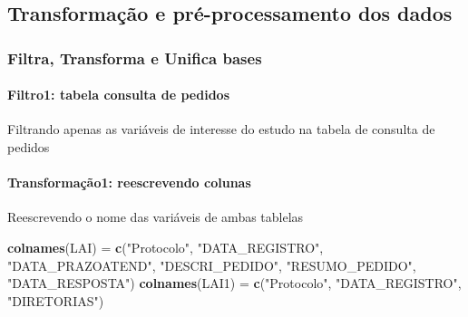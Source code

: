 \documentclass[]{article}
\newenvironment{Shaded}{\begin{snugshade}}{\end{snugshade}}
\newcommand{\KeywordTok}[1]{\textcolor[rgb]{0.13,0.29,0.53}{\textbf{#1}}}
\newcommand{\DataTypeTok}[1]{\textcolor[rgb]{0.13,0.29,0.53}{#1}}
\newcommand{\StringTok}[1]{\textcolor[rgb]{0.31,0.60,0.02}{#1}}
\newcommand{\OperatorTok}[1]{\textcolor[rgb]{0.81,0.36,0.00}{\textbf{#1}}}
\newcommand{\NormalTok}[1]{#1}
\let\oldparagraph\paragraph
\renewcommand{\paragraph}[1]{\oldparagraph{#1}\mbox{}}
\begin{document}
\subsection{Transformação e pré-processamento dos
dados}\label{transformacao-e-pre-processamento-dos-dados}

\subsubsection{Filtra, Transforma e Unifica
bases}\label{filtra-transforma-e-unifica-bases}

\paragraph{Filtro1: tabela consulta de
pedidos}\label{filtro1-tabela-consulta-de-pedidos}

Filtrando apenas as variáveis de interesse do estudo na tabela de
consulta de pedidos

\begin{Shaded}
\end{Shaded}

\paragraph{Transformação1: reescrevendo
colunas}\label{transformacao1-reescrevendo-colunas}

Reescrevendo o nome das variáveis de ambas tablelas

\begin{Shaded}
\begin{Highlighting}[]
\KeywordTok{colnames}\NormalTok{(LAI) =}\StringTok{ }\KeywordTok{c}\NormalTok{(}\StringTok{"Protocolo"}\NormalTok{, }\StringTok{"DATA_REGISTRO"}\NormalTok{, }\StringTok{"DATA_PRAZOATEND"}\NormalTok{, }\StringTok{"DESCRI_PEDIDO"}\NormalTok{,}
                     \StringTok{"RESUMO_PEDIDO"}\NormalTok{, }\StringTok{"DATA_RESPOSTA"}\NormalTok{)}
\KeywordTok{colnames}\NormalTok{(LAI1) =}\StringTok{ }\KeywordTok{c}\NormalTok{(}\StringTok{"Protocolo"}\NormalTok{, }\StringTok{"DATA_REGISTRO"}\NormalTok{, }\StringTok{"DIRETORIAS"}\NormalTok{)}
\end{Highlighting}
\end{Shaded}
\end{document}
